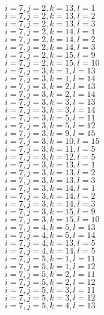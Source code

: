 \documentclass[14pt]{article}
\begin{document}
    $i=7,j=2,k=13,l=1 $ \\ 
    $i=7,j=2,k=13,l=2 $ \\ 
    $i=7,j=2,k=13,l=3 $ \\ 
    $i=7,j=2,k=14,l=1 $ \\ 
    $i=7,j=2,k=14,l=2 $ \\ 
    $i=7,j=2,k=14,l=3 $ \\ 
    $i=7,j=2,k=15,l=9 $ \\ 
    $i=7,j=2,k=15,l=10 $ \\ 
    $i=7,j=3,k=1,l=13 $ \\ 
    $i=7,j=3,k=1,l=14 $ \\ 
    $i=7,j=3,k=2,l=13 $ \\ 
    $i=7,j=3,k=2,l=14 $ \\ 
    $i=7,j=3,k=3,l=13 $ \\ 
    $i=7,j=3,k=3,l=14 $ \\ 
    $i=7,j=3,k=5,l=11 $ \\ 
    $i=7,j=3,k=5,l=12 $ \\ 
    $i=7,j=3,k=9,l=15 $ \\ 
    $i=7,j=3,k=10,l=15 $ \\ 
    $i=7,j=3,k=11,l=5 $ \\ 
    $i=7,j=3,k=12,l=5 $ \\ 
    $i=7,j=3,k=13,l=1 $ \\ 
    $i=7,j=3,k=13,l=2 $ \\ 
    $i=7,j=3,k=13,l=3 $ \\ 
    $i=7,j=3,k=14,l=1 $ \\ 
    $i=7,j=3,k=14,l=2 $ \\ 
    $i=7,j=3,k=14,l=3 $ \\ 
    $i=7,j=3,k=15,l=9 $ \\ 
    $i=7,j=3,k=15,l=10 $ \\ 
    $i=7,j=4,k=5,l=13 $ \\ 
    $i=7,j=4,k=5,l=14 $ \\ 
    $i=7,j=4,k=13,l=5 $ \\ 
    $i=7,j=4,k=14,l=5 $ \\ 
    $i=7,j=5,k=1,l=11 $ \\ 
    $i=7,j=5,k=1,l=12 $ \\ 
    $i=7,j=5,k=2,l=11 $ \\ 
    $i=7,j=5,k=2,l=12 $ \\ 
    $i=7,j=5,k=3,l=11 $ \\ 
    $i=7,j=5,k=3,l=12 $ \\ 
    $i=7,j=5,k=4,l=13 $ \\ 
\end{document}
